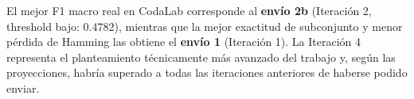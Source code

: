 \documentclass[11pt, a4paper]{article}
\begin{document}
El mejor F1 macro real en CodaLab corresponde al \textbf{envío 2b} (Iteración 2, threshold bajo: 0.4782), mientras que la mejor exactitud de subconjunto y menor pérdida de Hamming las obtiene el \textbf{envío 1} (Iteración 1). La Iteración 4 representa el planteamiento técnicamente más avanzado del trabajo y, según las proyecciones, habría superado a todas las iteraciones anteriores de haberse podido enviar.
\end{document}

